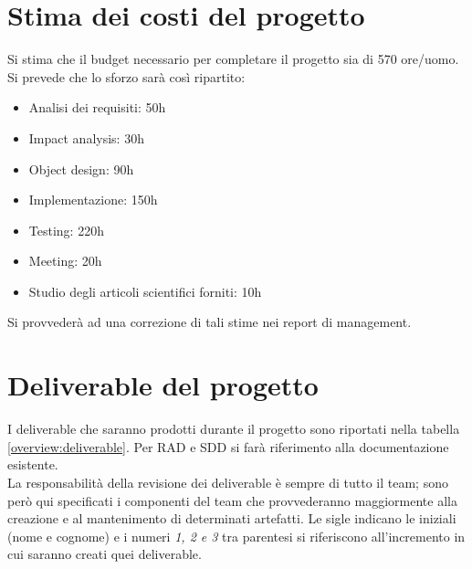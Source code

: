 \section{Stima dei costi del progetto}
Si stima che il budget necessario per completare il progetto sia di 570 ore/uomo. Si prevede che lo sforzo sarà così ripartito:\\
\begin{itemize}
\item Analisi dei requisiti: 50h
\item Impact analysis: 30h
\item Object design: 90h
\item Implementazione: 150h
\item Testing: 220h
\item Meeting: 20h
\item Studio degli articoli scientifici forniti: 10h
\end{itemize}
Si provvederà ad una correzione di tali stime nei report di management.

\section{Deliverable del progetto}
I deliverable che saranno prodotti durante il progetto sono riportati nella tabella \ref{overview:deliverable}. Per RAD e SDD si farà riferimento alla documentazione esistente.\\
La responsabilità della revisione dei deliverable è sempre di tutto il team; sono però qui specificati i componenti del team che provvederanno maggiormente alla creazione e al mantenimento di determinati artefatti. Le sigle indicano le iniziali (nome e cognome) e i numeri \emph{1, 2 e 3} tra parentesi si riferiscono all'incremento in cui saranno creati quei deliverable.


